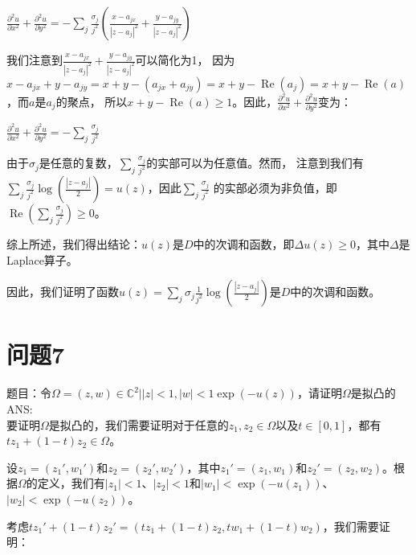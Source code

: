 \documentclass[12pt, a4paper, oneside]{ctexart}
\begin{document}
\begin{spacing}{2.0}
\begin{center}
    $\displaystyle \frac{\partial^2u}{\partial x^2}+\frac{\partial^2u}{\partial y^2}=-\sum_j\frac{\sigma_j}{j^2}\left(\frac{x-a_{jx}}{|z-a_j|^2}+\frac{y-a_{jy}}{|z-a_j|^2}\right)$
\end{center}

我们注意到$\displaystyle \frac{x-a_{jx}}{|z-a_j|^2} + \frac{y-a_{jy}}{|z-a_j|^2}$可以简化为1，
因为$\displaystyle x-a_{jx}+y-a_{jy}=x+y-(a_{jx}+a_{jy})=x+y-\operatorname{Re}(a_j)=x+y-\operatorname{Re}(a)$，而$a$是$a_j$的聚点，
所以$\displaystyle x+y-\operatorname{Re}(a) \geq 1$。因此，$\displaystyle \frac{\partial^2 u}{\partial x^2} + \frac{\partial^2 u}{\partial y^2}$变为：

\begin{center}
    $\displaystyle \frac{\partial^2u}{\partial x^2}+\frac{\partial^2u}{\partial y^2}=-\sum_j\frac{\sigma_j}{j^2}$
\end{center}
由于$\sigma_j$是任意的复数，$\sum_{j}\frac{\sigma_j}{j^2}$的实部可以为任意值。然而，
注意到我们有$\displaystyle \sum_{j}\frac{\sigma_j}{j^2}\log\left(\frac{|z-a_j|}{2}\right) = u(z)$，因此$\displaystyle \sum_{j}\frac{\sigma_j}{j^2}$
的实部必须为非负值，即$\displaystyle \operatorname{Re}\left(\sum_{j}\frac{\sigma_j}{j^2}\right) \geq 0$。

综上所述，我们得出结论：$u(z)$是$D$中的次调和函数，即$\Delta u(z) \geq 0$，其中$\Delta$是Laplace算子。

因此，我们证明了函数$\displaystyle u(z) = \sum_{j}\sigma_j \frac{1}{j^2}\log\left(\frac{|z-a_j|}{2}\right)$是$D$中的次调和函数。
\section{问题7}
题目：令$\displaystyle \Omega = {(z, w) \in \mathbb{C}^2||z|<1, |w|<1\exp(-u(z))}$，请证明$\Omega$是拟凸的\\

ANS:
\\

要证明$\Omega$是拟凸的，我们需要证明对于任意的$z_1, z_2 \in \Omega$以及$t \in [0,1]$，都有$tz_1 + (1-t)z_2 \in \Omega$。

设$\displaystyle z_1 = (z_1', w_1')$和$z_2 = (z_2', w_2')$，其中$\displaystyle z_1' = (z_1, w_1)$和$z_2' = (z_2, w_2)$。根据$\Omega$的定义，我们有$|z_1| < 1$、$|z_2| < 1$和$|w_1| < \exp(-u(z_1))$、$|w_2| < \exp(-u(z_2))$。

考虑$\displaystyle tz_1' + (1-t)z_2' = (tz_1 + (1-t)z_2, tw_1 + (1-t)w_2)$，我们需要证明：


\end{spacing}
\end{document}
